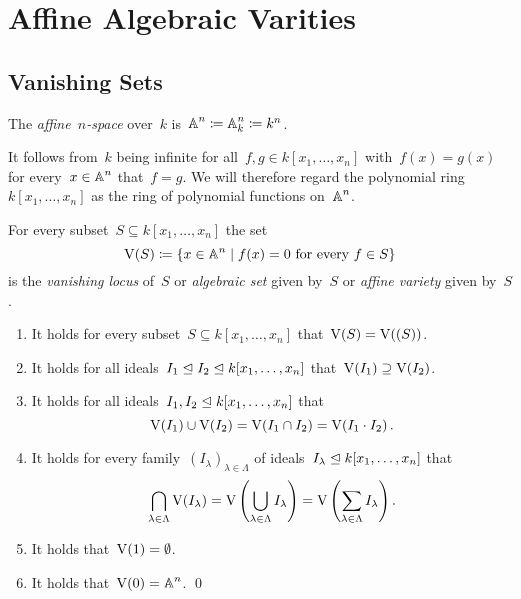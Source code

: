 \section{Affine Algebraic Varities}





\subsection{Vanishing Sets}


\begin{definition}
  The \emph{affine~$n$-space} over~$k$ is~$\operatorname{\mathbb{A}}^n \coloneqq \operatorname{\mathbb{A}}^n_k \coloneqq k^n$.
\end{definition}


\begin{fluff}
  It follows from~$k$ being infinite for all~$f, g \in k[x_1, \dotsc, x_n]$ with~$f(x) = g(x)$ for every~$x \in \operatorname{\mathbb{A}}^n$ that~$f = g$.
  We will therefore regard the polynomial ring~$k[x_1, \dotsc, x_n]$ as the ring of polynomial functions on~$\operatorname{\mathbb{A}}^n$.
\end{fluff}


\begin{definition}
  For every subset~$S \subseteq k[x_1, \dotsc, x_n]$ the set
  \[
              \vset(S)
    \defined  \{
                x \in \Aff^n
              \suchthat
                \text{$f(x) = 0$ for every~$f \in S$}
              \}
  \]
  is the \emph{vanishing locus} of~$S$ or \emph{algebraic set} given by~$S$ or \emph{affine variety} given by~$S$.
\end{definition}


\begin{lemma}
  \label{properties of vanishing sets}
  \leavevmode
  \begin{enumerate}
    \item
      It holds for every subset~$S \subseteq k[x_1, \dotsc, x_n]$ that~$\operatorname{V}(S) = \operatorname{V}( (S) )$.
    \item
      It holds for all ideals~$I_1 \trianglelefteq I_2 \trianglelefteq k[x_1, \dotsc, x_n]$ that~$\operatorname{V}(I_1) \supseteq \operatorname{V}(I_2)$.
    \item
      It holds for all ideals~$I_1, I_2 \trianglelefteq k[x_1, \dotsc, x_n]$ that
      \[
          \operatorname{V}(I_1) \cup \operatorname{V}(I_2)
        = \operatorname{V}(I_1 \cap I_2)
        = \operatorname{V}(I_1 \cdot I_2) \,.
      \]
    \item
      It holds for every family~$(I_\lambda)_{\lambda \in \Lambda}$ of ideals~$I_\lambda \trianglelefteq k[x_1, \dotsc, x_n]$ that
      \[
          \bigcap_{\lambda \in \Lambda} \operatorname{V}(I_\lambda)
        = \operatorname{V}\left( \bigcup_{\lambda \in \Lambda} I_\lambda \right)
        = \operatorname{V}\left( \sum_{\lambda \in \Lambda} I_\lambda \right) .
      \]
    \item
      It holds that~$\operatorname{V}(1) = \emptyset$.
    \item
      It holds that~$\operatorname{V}(0) = \operatorname{\mathbb{A}}^n$.
    \qed
  \end{enumerate}
\end{lemma}


